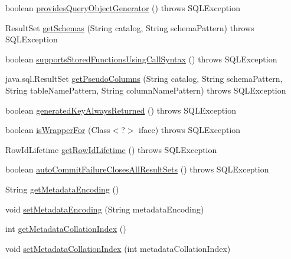 \begin{DoxyCompactItemize}
\item 
boolean \mbox{\hyperlink{classcom_1_1mysql_1_1cj_1_1jdbc_1_1_database_meta_data_a4f51c3d0f0171ac7e0c4438ed4c3623d}{provides\+Query\+Object\+Generator}} ()  throws S\+Q\+L\+Exception 
\item 
Result\+Set \mbox{\hyperlink{classcom_1_1mysql_1_1cj_1_1jdbc_1_1_database_meta_data_a87cfe1203d2da7ca4acc7c3ea033118f}{get\+Schemas}} (String catalog, String schema\+Pattern)  throws S\+Q\+L\+Exception 
\item 
boolean \mbox{\hyperlink{classcom_1_1mysql_1_1cj_1_1jdbc_1_1_database_meta_data_a56930c0a067d1194bb7170cf2f02253c}{supports\+Stored\+Functions\+Using\+Call\+Syntax}} ()  throws S\+Q\+L\+Exception 
\item 
java.\+sql.\+Result\+Set \mbox{\hyperlink{classcom_1_1mysql_1_1cj_1_1jdbc_1_1_database_meta_data_a73c07590f0e4126b32717521f8e2c4f6}{get\+Pseudo\+Columns}} (String catalog, String schema\+Pattern, String table\+Name\+Pattern, String column\+Name\+Pattern)  throws S\+Q\+L\+Exception 
\item 
boolean \mbox{\hyperlink{classcom_1_1mysql_1_1cj_1_1jdbc_1_1_database_meta_data_a1ea77ece9e49b06c4ce2ea55d0fef7de}{generated\+Key\+Always\+Returned}} ()  throws S\+Q\+L\+Exception 
\item 
boolean \mbox{\hyperlink{classcom_1_1mysql_1_1cj_1_1jdbc_1_1_database_meta_data_a8e0ea42ccbf774371b197a8bd88b42d3}{is\+Wrapper\+For}} (Class$<$?$>$ iface)  throws S\+Q\+L\+Exception 
\item 
Row\+Id\+Lifetime \mbox{\hyperlink{classcom_1_1mysql_1_1cj_1_1jdbc_1_1_database_meta_data_ad52a8d0aa3c87e60af97a39d4819509a}{get\+Row\+Id\+Lifetime}} ()  throws S\+Q\+L\+Exception 
\item 
boolean \mbox{\hyperlink{classcom_1_1mysql_1_1cj_1_1jdbc_1_1_database_meta_data_acadecc234640e9cc54b2730537aa4482}{auto\+Commit\+Failure\+Closes\+All\+Result\+Sets}} ()  throws S\+Q\+L\+Exception 
\item 
String \mbox{\hyperlink{classcom_1_1mysql_1_1cj_1_1jdbc_1_1_database_meta_data_abaf2a186f349f206faf7bdea13e8ed10}{get\+Metadata\+Encoding}} ()
\item 
void \mbox{\hyperlink{classcom_1_1mysql_1_1cj_1_1jdbc_1_1_database_meta_data_a86a2b8462fa1740812ae01ab9b0a5abe}{set\+Metadata\+Encoding}} (String metadata\+Encoding)
\item 
int \mbox{\hyperlink{classcom_1_1mysql_1_1cj_1_1jdbc_1_1_database_meta_data_a861d145aaa9842ad98ecec5b32c90a10}{get\+Metadata\+Collation\+Index}} ()
\item 
void \mbox{\hyperlink{classcom_1_1mysql_1_1cj_1_1jdbc_1_1_database_meta_data_a7d449201565645e2febe0da0ffef7cd7}{set\+Metadata\+Collation\+Index}} (int metadata\+Collation\+Index)
\end{DoxyCompactItemize}
